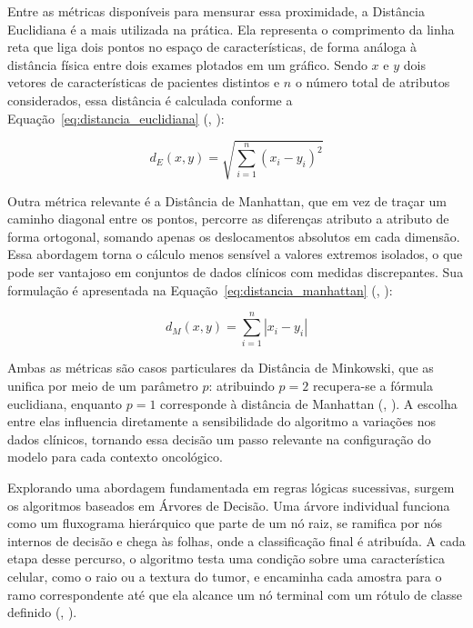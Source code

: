 \documentclass[
    12pt
    ,oneside
    ,a4paper
    ,chapter=TITLE
    ,section=TITLE
    ,sumario=abnt-6027-2012
    ,english,brazil]{abntex2} %
\begin{document}
Entre as métricas disponíveis para mensurar essa proximidade, a Distância Euclidiana é a mais utilizada na prática. Ela representa o comprimento da linha reta que liga dois pontos no espaço de características, de forma análoga à distância física entre dois exames plotados em um gráfico. Sendo $x$ e $y$ dois vetores de características de pacientes distintos e $n$ o número total de atributos considerados, essa distância é calculada conforme a Equação~\ref{eq:distancia_euclidiana} (, \citeyear{ibm_knn_2026}):

\begin{equation}
\label{eq:distancia_euclidiana}
d_E(x, y) = \sqrt{\sum_{i=1}^{n} (x_i - y_i)^2}
\end{equation}

Outra métrica relevante é a Distância de Manhattan, que em vez de traçar um caminho diagonal entre os pontos, percorre as diferenças atributo a atributo de forma ortogonal, somando apenas os deslocamentos absolutos em cada dimensão. Essa abordagem torna o cálculo menos sensível a valores extremos isolados, o que pode ser vantajoso em conjuntos de dados clínicos com medidas discrepantes. Sua formulação é apresentada na Equação~\ref{eq:distancia_manhattan} (, \citeyear{ibm_knn_2026}):

\begin{equation}
\label{eq:distancia_manhattan}
d_M(x, y) = \sum_{i=1}^{n} |x_i - y_i|
\end{equation}

Ambas as métricas são casos particulares da Distância de Minkowski, que as unifica por meio de um parâmetro $p$: atribuindo $p = 2$ recupera-se a fórmula euclidiana, enquanto $p = 1$ corresponde à distância de Manhattan (, \citeyear{ibm_knn_2026}). A escolha entre elas influencia diretamente a sensibilidade do algoritmo a variações nos dados clínicos, tornando essa decisão um passo relevante na configuração do modelo para cada contexto oncológico.

Explorando uma abordagem fundamentada em regras lógicas sucessivas, surgem os algoritmos baseados em Árvores de Decisão. Uma árvore individual funciona como um fluxograma hierárquico que parte de um nó raiz, se ramifica por nós internos de decisão e chega às folhas, onde a classificação final é atribuída. A cada etapa desse percurso, o algoritmo testa uma condição sobre uma característica celular, como o raio ou a textura do tumor, e encaminha cada amostra para o ramo correspondente até que ela alcance um nó terminal com um rótulo de classe definido (, \citeyear{ibm_decision_tree_2026}).
\end{document}
